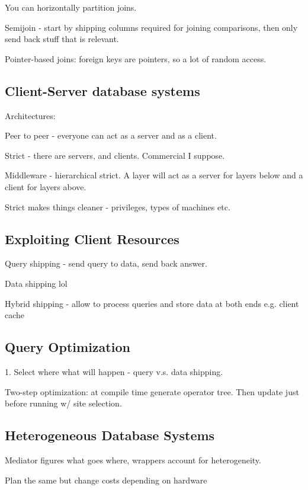 \documentclass{article}
\begin{document}
		You can horizontally partition joins.
		
		Semijoin - start by shipping columns required for joining comparisons, then only send back stuff that is relevant.
		
		Pointer-based joins: foreign keys are pointers, so a lot of random access.
		
	\subsection{Client-Server database systems}
	
		Architectures:
		
		Peer to peer - everyone can act as a server and as a client.
		
		Strict - there are servers, and clients. Commercial I suppose.
		
		Middleware - hierarchical strict. A layer will act as a server for layers below and a client for layers above.
		
		Strict makes things cleaner - privileges, types of machines etc.
		
	\subsection{Exploiting Client Resources}
	
		Query shipping - send query to data, send back answer.
		
		Data shipping lol
		
		Hybrid shipping - allow to process queries and store data at both ends e.g. client cache
		
	\subsection{Query Optimization}
	
		1. Select where what will happen - query v.s. data shipping.
		
		Two-step optimization: at compile time generate operator tree. Then update just before running w/ site selection.
		
	\subsection{Heterogeneous Database Systems}
	
		Mediator figures what goes where, wrappers account for heterogeneity.
		
		Plan the same but change costs depending on hardware
		
\end{document}
